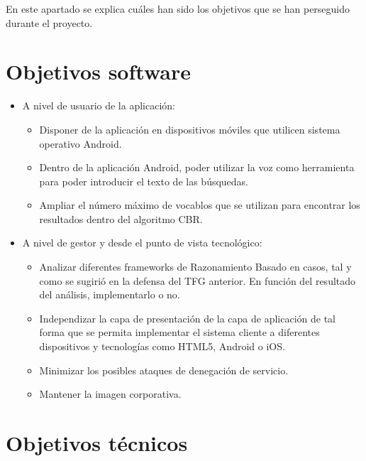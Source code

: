 
En este apartado se explica cuáles han sido los objetivos que se han perseguido durante el proyecto.

\section{Objetivos software}\label{objetivos-software}

\begin{itemize}
	\tightlist
	\item
	A nivel de usuario de la aplicación:
	\begin{itemize}
		\tightlist
		\item
		Disponer de la aplicación en dispositivos móviles que utilicen sistema operativo Android.
		\item
		Dentro de la aplicación Android, poder utilizar la voz como herramienta para poder introducir el texto de las búsquedas.
		\item 
		Ampliar el número máximo de vocablos que se utilizan para encontrar los resultados dentro del algoritmo CBR.
	\end{itemize}
	\item 
	A nivel de gestor y desde el punto de vista tecnológico:
	\begin{itemize}
		\tightlist
		\item
		Analizar diferentes frameworks de Razonamiento Basado en casos, tal y como se sugirió en la defensa del TFG anterior. En función del resultado del análisis, implementarlo o no.
		\item 
		Independizar la capa de presentación de la capa de aplicación de tal forma que se permita implementar el sistema cliente a diferentes dispositivos y tecnologías como HTML5, Android o iOS.
		\item 
		Minimizar los posibles ataques de denegación de servicio.
		\item 
		Mantener la imagen corporativa.
	\end{itemize}
\end{itemize}

\section{Objetivos técnicos}\label{objetivos-tecnicos}

